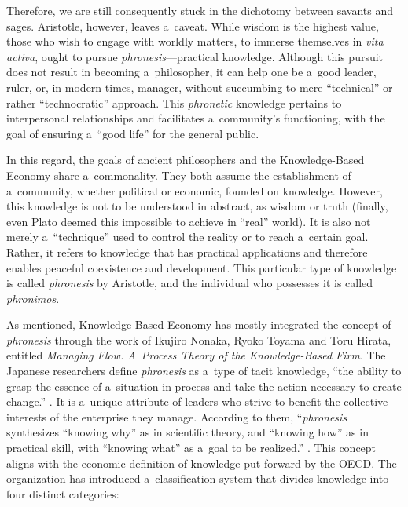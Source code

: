 Therefore, we are still consequently stuck in the dichotomy between savants and sages. Aristotle, however, leaves a~caveat. While wisdom is the highest value, those who wish to engage with worldly matters, to immerse themselves in \textit{vita activa}, ought to pursue \textit{phronesis}---practical knowledge. Although this pursuit does not result in becoming a~philosopher, it can help one be a~good leader, ruler, or, in modern times, manager, without succumbing to mere ``technical'' or rather ``technocratic'' approach. This \textit{phronetic} knowledge pertains to interpersonal relationships and facilitates a~community's functioning, with the goal of ensuring a~``good life'' for the general public.



In this regard, the goals of ancient philosophers and the Knowledge-Based Economy share a~commonality. They both assume the establishment of a~community, whether political or economic, founded on knowledge. However, this knowledge is not to be understood in abstract, as wisdom or truth (finally, even Plato deemed this impossible to achieve in ``real'' world). It is also not merely a~``technique'' used to control the reality or to reach a~certain goal. Rather, it refers to knowledge that has practical applications and therefore enables peaceful coexistence and development. This particular type of knowledge is called \textit{phronesis} by Aristotle, and the individual who possesses it is called \textit{phronimos}.



As mentioned, Knowledge-Based Economy has mostly integrated the concept of \textit{phronesis} through the work of Ikujiro Nonaka, Ryoko Toyama and Toru Hirata, entitled \textit{Managing Flow. A~Process Theory of the Knowledge-Based Firm}. The Japanese researchers define \textit{phronesis} as a~type of tacit knowledge, ``the ability to grasp the essence of a~situation in process and take the action necessary to create change.'' 
\parencite[][p.4]{nonaka_managing_2008}. %
 It is a~unique attribute of leaders who strive to benefit the collective interests of the enterprise they manage. According to them, ``\textit{phronesis} synthesizes ``knowing why'' as in scientific theory, and ``knowing how'' as in practical skill, with ``knowing what'' as a~goal to be realized.'' 
\parencite[][pp.14–15]{nonaka_managing_2008}. %
 This concept aligns with the economic definition of knowledge put forward by the OECD. The organization has introduced a~classification system that divides knowledge into four distinct categories:



